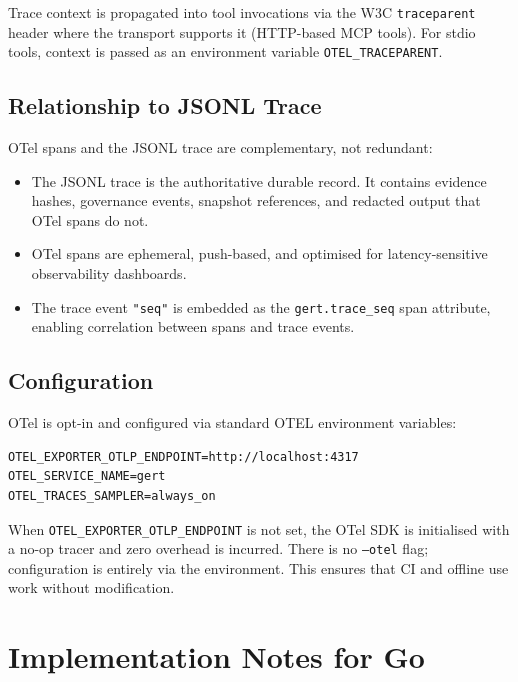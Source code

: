 Trace context is propagated into tool invocations via the W3C \texttt{traceparent} header where the transport supports it (HTTP-based MCP tools). For stdio tools, context is passed as an environment variable \texttt{OTEL\_TRACEPARENT}.

\subsection{Relationship to JSONL Trace}

OTel spans and the JSONL trace are complementary, not redundant:

\begin{itemize}
  \item The JSONL trace is the authoritative durable record. It contains evidence hashes, governance events, snapshot references, and redacted output that OTel spans do not.
  \item OTel spans are ephemeral, push-based, and optimised for latency-sensitive observability dashboards.
  \item The trace event \texttt{"seq"} is embedded as the \texttt{gert.trace\_seq} span attribute, enabling correlation between spans and trace events.
\end{itemize}

\subsection{Configuration}

OTel is opt-in and configured via standard OTEL environment variables:

\begin{verbatim}
OTEL_EXPORTER_OTLP_ENDPOINT=http://localhost:4317
OTEL_SERVICE_NAME=gert
OTEL_TRACES_SAMPLER=always_on
\end{verbatim}

When \texttt{OTEL\_EXPORTER\_OTLP\_ENDPOINT} is not set, the OTel SDK is initialised with a no-op tracer and zero overhead is incurred. There is no \texttt{--otel} flag; configuration is entirely via the environment. This ensures that CI and offline use work without modification.

\section{Implementation Notes for Go}

